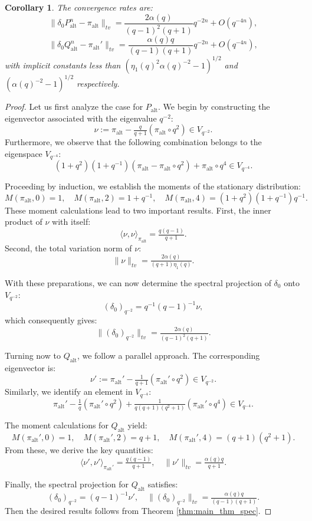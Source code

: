 \documentclass[a4]{amsart}
\newcommand{\alt}{{\mathrm{alt}}}
\newtheorem{corollary}[theorem]{Corollary}
\theoremstyle{remark} \newtheorem{remark}[theorem]{Remark}
\begin{document}
\begin{corollary}\label{cor:alt_converg}
The convergence rates are:
\[
\|\delta_0 P_\alt^n - \pi_\alt\|_{tv} = \frac{2\alpha(q)}{(q-1)^2(q+1)} q^{-2n} + O(q^{-4n}),
\]
\[
\|\delta_0 Q_\alt^n - \pi_\alt'\|_{tv} = \frac{\alpha(q) q}{(q-1)(q+1)} q^{-2n} + O(q^{-4n}),
\]
with implicit constants less than $(\eta_1(q)^2\alpha(q)^{-2}-1)^{1/2}$ and $(\alpha(q)^{-2}-1)^{1/2}$ respectively.
\end{corollary}

\begin{proof}
Let us first analyze the case for $P_\alt$. We begin by constructing the eigenvector associated with the eigenvalue $q^{-2}$:
\[
\nu := \pi_\alt - \tfrac{q}{q+1}(\pi_\alt \circ q^2) \in V_{q^{-2}}.
\]
Furthermore, we observe that the following combination belongs to the eigenspace $V_{q^{-4}}$:
\[
(1+q^2)(1+q^{-1})(\pi_\alt-\pi_\alt\circ q^2)+\pi_\alt\circ q^4 \in V_{q^{-4}}.
\]

Proceeding by induction, we establish the moments of the stationary distribution:
\[
M(\pi_\alt, 0) = 1, \quad M(\pi_\alt, 2) = 1 + q^{-1}, \quad M(\pi_\alt, 4) = (1+q^2)(1+q^{-1})q^{-1}.
\]
These moment calculations lead to two important results. First, the inner product of $\nu$ with itself:
\[
\langle \nu, \nu \rangle_{\pi_\alt} = \tfrac{q(q-1)}{q+1}.
\]
Second, the total variation norm of $\nu$:
\[
\|\nu\|_{tv} = \tfrac{2\alpha(q)}{(q+1)\eta_1(q)}.
\]

With these preparations, we can now determine the spectral projection of $\delta_0$ onto $V_{q^{-2}}$:
\[
(\delta_0)_{q^{-2}} = q^{-1}(q-1)^{-1} \nu,
\]
which consequently gives:
\[
\|(\delta_0)_{q^{-2}}\|_{tv} = \tfrac{2\alpha(q)}{(q-1)^2(q+1)}.
\]

Turning now to $Q_\alt$, we follow a parallel approach. The corresponding eigenvector is:
\[
\nu' := \pi_\alt' - \tfrac{1}{q+1}(\pi_\alt' \circ q^2) \in V_{q^{-2}}.
\]
Similarly, we identify an element in $V_{q^{-4}}$:
\[
\pi_\alt'-\tfrac{1}{q}(\pi_\alt'\circ q^2)+\tfrac{1}{q(q+1)(q^2+1)}(\pi_\alt'\circ q^4) \in V_{q^{-4}}.
\]

The moment calculations for $Q_\alt$ yield:
\[
M(\pi_\alt', 0) = 1, \quad M(\pi_\alt', 2) = q+1, \quad M(\pi_\alt', 4) = (q+1)(q^2+1).
\]
From these, we derive the key quantities:
\[
\langle \nu', \nu' \rangle_{\pi_\alt'} = \tfrac{q(q-1)}{q+1}, \quad \|\nu'\|_{tv} = \tfrac{\alpha(q) q}{q+1}.
\]

Finally, the spectral projection for $Q_\alt$ satisfies:
\[
(\delta_0)_{q^{-2}} = (q-1)^{-1} \nu', \quad \|(\delta_0)_{q^{-2}}\|_{tv} = \tfrac{\alpha(q) q}{(q-1)(q+1)}.
\]
Then the desired results follows from Theorem \ref{thm:main_thm_spec}.
\end{proof}
\medskip  
\end{document}
